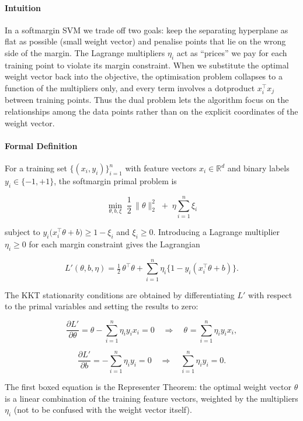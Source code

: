 \documentclass[12pt, a4paper]{article}
\begin{document}
\paragraph{Intuition}
In a softmargin SVM we trade off two goals: keep the separating hyperplane as flat as possible (small weight vector) and penalise points that lie on the wrong side of the margin.  
The Lagrange multipliers $\eta_i$ act as ``prices'' we pay for each training point to violate its margin constraint.  
When we substitute the optimal weight vector back into the objective, the optimisation problem collapses to a function of the multipliers only, and every term involves a dotproduct $x_i^{\!\top}x_j$ between training points.  
Thus the dual problem lets the algorithm focus on the relationships among the data points rather than on the explicit coordinates of the weight vector.

\paragraph{Formal Definition}
For a training set $\{(x_i,y_i)\}_{i=1}^{n}$ with feature vectors $x_i\in\mathbb{R}^d$ and binary labels $y_i\in\{-1,+1\}$, the softmargin primal problem is  

\[
\min_{\theta,b,\xi}\;\frac{1}{2}\,\|\theta\|_2^{2}\;+\;\eta\sum_{i=1}^{n}\xi_i
\]

subject to $y_i\bigl(x_i^{\!\top}\theta+b\bigr)\ge 1-\xi_i$ and $\xi_i\ge0$.  
Introducing a Lagrange multiplier $\eta_i\ge0$ for each margin constraint gives the Lagrangian  

\[
L'(\theta,b,\eta)=\tfrac12\,\theta^{\!\top}\theta
+\sum_{i=1}^{n}\eta_i\bigl\{1-y_i(x_i^{\!\top}\theta+b)\bigr\}.
\]

The KKT stationarity conditions are obtained by differentiating $L'$ with respect to the primal variables and setting the results to zero:

\[
\frac{\partial L'}{\partial \theta}= \theta-\sum_{i=1}^{n}\eta_i y_i x_i =0
\quad\Longrightarrow\quad
\boxed{\theta^{}= \sum_{i=1}^{n}\eta_i y_i x_i},
\]

\[
\frac{\partial L'}{\partial b}= -\sum_{i=1}^{n}\eta_i y_i =0
\quad\Longrightarrow\quad
\boxed{\sum_{i=1}^{n}\eta_i y_i =0 } .
\]

The first boxed equation is the Representer Theorem: the optimal weight vector $\theta^{}$ is a linear combination of the training feature vectors, weighted by the multipliers $\eta_i$ (not to be confused with the weight vector itself).
\end{document}
